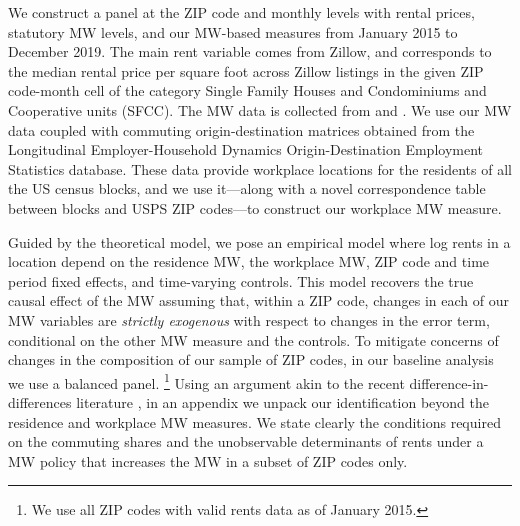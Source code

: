 We construct a panel at the ZIP code and monthly levels with rental prices, 
statutory MW levels, and our MW-based measures from January 2015 to December 2019.
The main rent variable comes from Zillow, and corresponds to the median 
rental price per square foot across Zillow listings in the given ZIP 
code-month cell of the category Single Family Houses and Condominiums and 
Cooperative units (SFCC).
The MW data is collected from \textcite{VaghulZipperer2016} and 
\textcite{BerkeleyLaborCenter}.
We use our MW data coupled with commuting origin-destination matrices obtained 
from the Longitudinal Employer-Household Dynamics Origin-Destination Employment 
Statistics \parencite[LODES;][]{CensusLODES} database.
These data provide workplace locations for the residents of all the US census 
blocks, and we use it---along with a novel correspondence table between blocks 
and USPS ZIP codes---to construct our workplace MW measure.


Guided by the theoretical model, we pose an empirical model where log rents in 
a location depend on
the residence MW, %
the workplace MW, %
ZIP code and time period fixed effects, and 
time-varying controls.
This model recovers the true causal effect of the MW assuming that, 
within a ZIP code, changes in each of our MW variables are 
\textit{strictly exogenous} with respect to changes in the error 
term, conditional on the other MW measure and the controls.
To mitigate concerns of changes in the composition of our sample of ZIP codes, 
in our baseline analysis we use a balanced panel.%
\footnote{We use all ZIP codes with valid rents data as of January 2015.}
Using an argument akin to the recent difference-in-differences literature
\parencite[e.g.,][]{CallawayEtAl2021}, 
in an appendix we unpack our identification beyond the residence and
workplace MW measures.
We state clearly the conditions required on the commuting shares and the 
unobservable determinants of rents under a MW policy that increases the MW in 
a subset of ZIP codes only.


